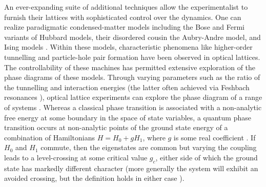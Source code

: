 	
	An ever-expanding suite of additional techniques allow the experimentalist to furnish their lattices with sophisticated control over the dynamics.
	One can realize paradigmatic condensed-matter models including the Bose \cite{Greiner01,Miranda15,Rispoli19,Sherson10,Preiss15a} and Fermi \cite{Bakr09,Cheuk15,Haller15,Chiu18} variants of Hubbard models, their disordered cousin the Aubry-Andre \cite{Rispoli19} model, and Ising models \cite{Simon11}.
	Within these models, characteristic phenomena like higher-order tunnelling \cite{Folling07} and particle-hole pair formation \cite{Endres11} have been observed in optical lattices.
	The controllability of these machines has permitted extensive exploration of the phase diagrams of these models.
	Through varying parameters such as the ratio of the tunnelling and interaction energies (the latter often achieved via Feshbach resonances \cite{Chin10}), optical lattice experiments can explore the phase diagram of a range of systems \cite{Greiner01,Eckardt05,Jordens08,Jo09,Haller10,Simon11,Baumann10,Leonard17,Landig16,SachdevQPT,Endres12,Anquez16,Clark16}.
	Whereas a classical phase transition is associated with a non-analytic free energy at some boundary in the space of state variables, a quantum phase transition occurs at non-analytic points of the ground state energy of a combination of Hamiltonians $H = H_0 + g H_1$, where $g$ is some real coefficient \cite{SachdevQPT}.
	If $H_0$ and $H_1$ commute, then the eigenstates are common but varying the coupling leads to a level-crossing at some critical value $g_c$, either side of which the ground state has markedly different character (more generally the system will exhibit an avoided crossing, but the definition holds in either case \cite{SachdevQPT}).
	
